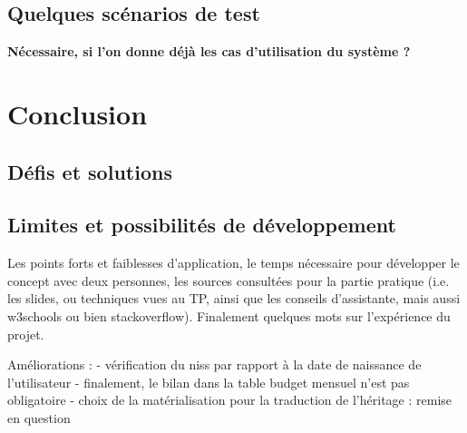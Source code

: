 \documentclass[a4paper,12pt]{article}
\begin{document}
\subsection{Quelques scénarios de test }

\textbf{Nécessaire, si l'on donne déjà les cas d'utilisation du système ?}

\newpage
\section{Conclusion}

\subsection{Défis et solutions}
\subsection{Limites et possibilités de développement}
Les points forts et faiblesses d’application, le temps nécessaire pour développer le concept avec deux personnes, les sources consultées pour la partie pratique (i.e. les slides, ou techniques vues au TP, ainsi que les conseils d’assistante, mais aussi w3schools ou bien stackoverflow).
Finalement quelques mots sur l'expérience du projet.

Améliorations : 
- vérification du niss par rapport à la date de naissance de l'utilisateur
- finalement, le bilan dans la table budget mensuel n'est pas obligatoire
- choix de la matérialisation pour la traduction de l'héritage : remise en question




\newpage

%
%

\end{document}
